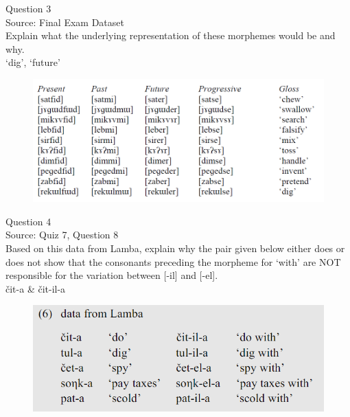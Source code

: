 \documentclass[12pt]{article}
\begin{document}
\newpage

{\large Question 3}\\

Source: Final Exam Dataset\\

Explain what the underlying representation of these morphemes would be and why.\\

`dig', `future'

\begin{figure}[H]
\includegraphics{../images/final_dataset.png}
\end{figure}

\newpage

{\large Question 4}\\

Source: Quiz 7, Question 8\\

Based on this data from Lamba, explain why the pair given below either does or does not show that the consonants preceding the morpheme for `with' are NOT responsible for the variation between [-il] and [-el].\\

čit-a \& čit-il-a

\begin{figure}[H]
\includegraphics{../images/peng119_lamba.png}
\end{figure}

\newpage
\end{document}
